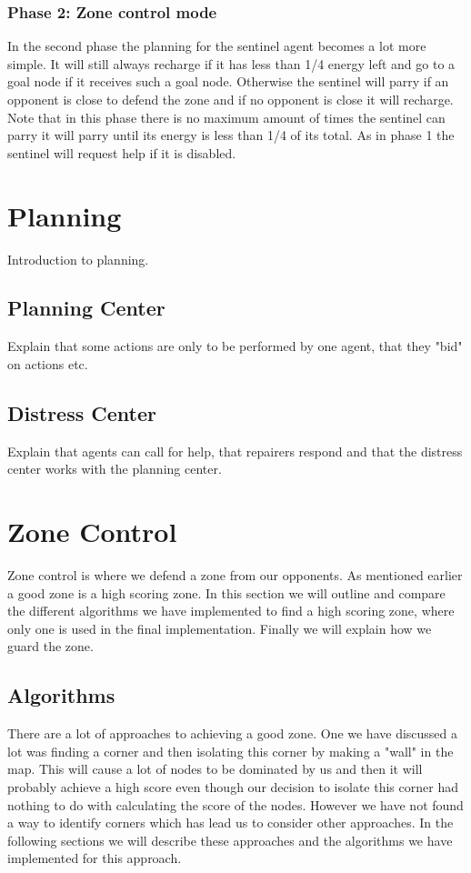 \documentclass[11pt]{article}
\begin{document}
\subsubsection{Phase 2: Zone control mode}
In the second phase the planning for the sentinel agent becomes a lot more simple. It will still always recharge if it has less than 1/4 energy left and go to a goal node if it receives such a goal node. Otherwise the sentinel will parry if an opponent is close to defend the zone and if no opponent is close it will recharge. Note that in this phase there is no maximum amount of times the sentinel can parry it will parry until its energy is less than 1/4 of its total. As in phase 1 the sentinel will request help if it is disabled.

\section{Planning}
Introduction to planning.

\subsection{Planning Center}
Explain that some actions are only to be performed by one agent, that they "bid" on actions etc.

\subsection{Distress Center}
Explain that agents can call for help, that repairers respond and that the distress center works with the planning center.

\section{Zone Control}
Zone control is where we defend a zone from our opponents. As mentioned earlier a good zone is a high scoring zone. In this section we will outline and compare the different algorithms we have implemented to find a high scoring zone, where only one is used in the final implementation. Finally we will explain how we guard the zone.

\subsection{Algorithms}
There are a lot of approaches to achieving a good zone. One we have discussed a lot was finding a corner and then isolating this corner by making a "wall" in the map. This will cause a lot of nodes to be dominated by us and then it will probably achieve a high score even though our decision to isolate this corner had nothing to do with calculating the score of the nodes. However we have not found a way to identify corners which has lead us to consider other approaches. In the following sections we will describe these approaches and the algorithms we have implemented for this approach.
\end{document}
